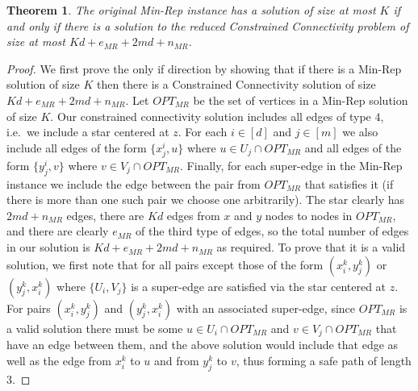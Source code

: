 \documentclass[11pt,letterpaper]{article}
\newtheorem{theorem}{Theorem}[section]
\theoremstyle{definition}
\newcounter{note}[section]
\begin{document}
\begin{theorem} \label{thm:Subgraph_Reduce}
  The original {\sc Min-Rep} instance has a solution of size at most
  $K$ if and only if there is a solution to the reduced Constrained
  Connectivity problem of size at most $Kd + e_{MR} +2md + n_{MR}$.
\end{theorem}
\begin{proof}
  We first prove the only if direction by showing that if there is a
  {\sc Min-Rep} solution of size $K$ then there is a Constrained
  Connectivity solution of size $Kd + e_{MR} + 2md + n_{MR}$.  Let
  $OPT_{MR}$ be the set of vertices in a Min-Rep solution of size $K$.
  Our constrained connectivity solution includes all edges of type
  $4$, i.e.\ we include a star centered at $z$.  For each $i \in [d]$
  and $j \in [m]$ we also include all edges of the form $\{x_j^i, u\}$
  where $u \in U_j \cap OPT_{MR}$ and all edges of the form $\{y_j^i,
  v\}$ where $v \in V_j \cap OPT_{MR}$.  Finally, for each super-edge
  in the Min-Rep instance we include the edge between the pair from
  $OPT_{MR}$ that satisfies it (if there is more than one such pair we
  choose one arbitrarily).  The star clearly has $2md +n_{MR}$ edges,
  there are $Kd$ edges from $x$ and $y$ nodes to nodes in $OPT_{MR}$,
  and there are clearly $e_{MR}$ of the third type of edges, so the
  total number of edges in our solution is $Kd + e_{MR} + 2md +
  n_{MR}$ as required.  To prove that it is a valid solution, we first
  note that for all pairs except those of the form $(x_i^k, y_j^k)$ or
  $(y_j^k, x_i^k)$ where $\{U_i, V_j\}$ is a super-edge are satisfied
  via the star centered at $z$.  For pairs $(x_i^k, y_j^k)$ and
  $(y_j^k, x_i^k)$ with an associated super-edge, since $OPT_{MR}$ is
  a valid solution there must be some $u \in U_i \cap OPT_{MR}$ and $v
  \in V_j \cap OPT_{MR}$ that have an edge between them, and the above
  solution would include that edge as well as the edge from $x_i^k$ to
  $u$ and from $y_j^k$ to $v$, thus forming a safe path of length $3$.


\end{proof}
\end{document}
